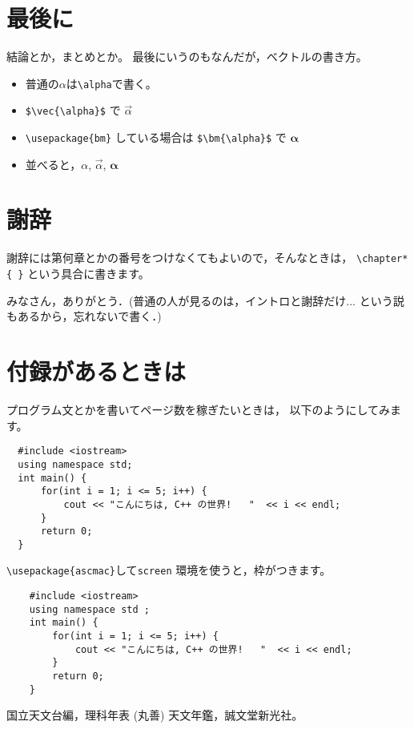\documentclass[a4paper, 12pt]{jsreport}
\begin{document}
  \chapter{最後に}


  結論とか，まとめとか。 最後にいうのもなんだが，ベクトルの書き方。
  \begin{itemize}
    \item 普通の$\alpha$は\verb|\alpha|で書く。

    \item \verb|$\vec{\alpha}$| で $\vec{\alpha}$

    \item \verb|\usepackage{bm}| している場合は \verb|$\bm{\alpha}$| で $\bm{\alpha}$

    \item 並べると，$\alpha$, $\vec{\alpha}$, $\bm{\alpha}$
  \end{itemize}

  \chapter*{謝辞}


  謝辞には第何章とかの番号をつけなくてもよいので，そんなときは，
  \verb|\chapter*{ }| という具合に書きます。

  みなさん，ありがとう．(普通の人が見るのは，イントロと謝辞だけ...
  という説もあるから，忘れないで書く．)

  \appendix
  \chapter{付録があるときは}
  プログラム文とかを書いてページ数を稼ぎたいときは， 以下のようにしてみます。

  \begin{verbatim}
  #include <iostream>
  using namespace std;
  int main() {
      for(int i = 1; i <= 5; i++) {
          cout << "こんにちは, C++ の世界!   "  << i << endl;
      }
      return 0;
  }
  \end{verbatim}
  \verb|\usepackage{ascmac}|して\verb|screen| 環境を使うと，枠がつきます。
  \begin{screen}
    \begin{verbatim}
    #include <iostream>
    using namespace std ;
    int main() {
        for(int i = 1; i <= 5; i++) {
            cout << "こんにちは, C++ の世界!   "  << i << endl;
        }
        return 0;
    }
    \end{verbatim}
  \end{screen}

  \begin{thebibliography}{99}
     国立天文台編，理科年表 (丸善)  天文年鑑，誠文堂新光社。
  \end{thebibliography}
\end{document}
